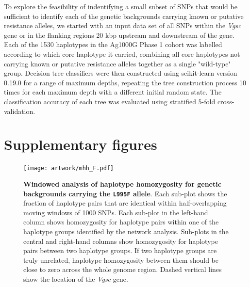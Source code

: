 \documentclass[a4paper,11pt,abstracton,hidelinks]{scrartcl}
\newcommand{\beginsupplement}{%
  \setcounter{table}{0}
  \renewcommand{\thetable}{S\arabic{table}}%
  \setcounter{figure}{0}
  \renewcommand{\thefigure}{S\arabic{figure}}%
}
\begin{document}
To explore the feasibility of indentifying a small subset of SNPs that would be sufficient to identify each of the genetic backgrounds carrying known or putative resistance alleles, we started with an input data set of all SNPs within the \textit{Vgsc} gene or in the flanking regions 20 kbp upstream and downstream of the gene.
%
Each of the 1530 haplotypes in the Ag1000G Phase 1 cohort was labelled according to which core haplotype it carried, combining all core haplotypes not carrying known or putative resistance alleles together as a single "wild-type" group.
%
Decision tree classifiers were then constructed using scikit-learn version 0.19.0 \cite{Pedregosa2011} for a range of maximum depths, repeating the tree construction process 10 times for each maximum depth with a different initial random state.
%
The classification accuracy of each tree was evaluated using stratified 5-fold cross-validation.
%


\printbibliography

\beginsupplement
\section*{Supplementary figures}

\clearpage

%
\begin{figure}[!b]
  \texttt{[image: artwork/mhh\_F.pdf]}
  \caption{\textbf{Windowed analysis of haplotype homozygosity for genetic backgrounds carrying the \texttt{L995F} allele}. Each sub-plot shows the fraction of haplotype pairs that are identical within half-overlapping moving windows of 1000 SNPs. Each sub-plot in the left-hand column shows homozygosity for haplotype pairs within one of the haplotype groups identified by the network analysis. Sub-plots in the central and right-hand columns show homozygosity for haplotype pairs between two haplotype groups. If two haplotype groups are truly unrelated, haplotype homozygosity between them should be close to zero across the whole genome region. Dashed vertical lines show the location of the \textit{Vgsc} gene.}
  \label{fig:mhh_f}
\end{figure}
\end{document}
